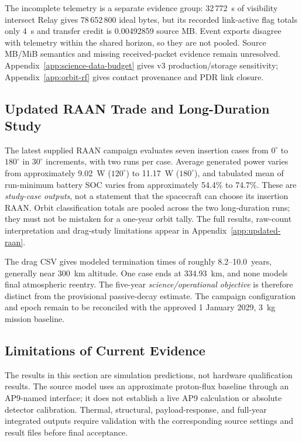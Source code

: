 The incomplete telemetry is a separate evidence group: 32\,772~s of visibility intersect Relay gives 78\,652\,800 ideal bytes, but its recorded link-active flag totals only 4~s and transfer credit is 0.00492859 source MB. Event exports disagree with telemetry within the shared horizon, so they are not pooled. Source MB/MiB semantics and missing received-packet evidence remain unresolved. Appendix~\ref{app:science-data-budget} gives v3 production/storage sensitivity; Appendix~\ref{app:orbit-rf} gives contact provenance and PDR link closure.

\subsection{Updated RAAN Trade and Long-Duration Study}\label{sec:sim-annual}
The latest supplied RAAN campaign evaluates seven insertion cases from $0^\circ$ to $180^\circ$ in $30^\circ$ increments, with two runs per case. Average generated power varies from approximately 9.02~W ($120^\circ$) to 11.17~W ($180^\circ$), and tabulated mean of run-minimum battery SOC varies from approximately 54.4\% to 74.7\%. These are \emph{study-case outputs}, not a statement that the spacecraft can choose its insertion RAAN. Orbit classification totals are pooled across the two long-duration runs; they must not be mistaken for a one-year orbit tally. The full results, raw-count interpretation and drag-study limitations appear in Appendix~\ref{app:updated-raan}.

The drag CSV gives modeled termination times of roughly 8.2--10.0~years, generally near 300~km altitude. One case ends at 334.93~km, and none models final atmospheric reentry. The five-year \emph{science/operational objective} is therefore distinct from the provisional passive-decay estimate. The campaign configuration and epoch remain to be reconciled with the approved 1 January 2029, 3~kg mission baseline.

\subsection{Limitations of Current Evidence}\label{sec:sim-consolidated}
The results in this section are simulation predictions, not hardware qualification results. The source model uses an approximate proton-flux baseline through an AP9-named interface; it does not establish a live AP9 calculation or absolute detector calibration. Thermal, structural, payload-response, and full-year integrated outputs require validation with the corresponding source settings and result files before final acceptance.

